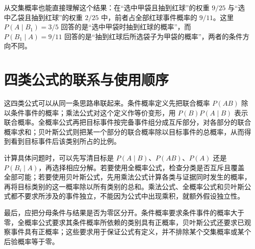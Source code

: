 \documentclass[UTF8]{ctexart}
\begin{document}
从交集概率也能直接理解这个结果：在“选中甲袋且抽到红球”的权重 $9/25$ 与“选中乙袋且抽到红球”的权重 $2/25$ 中，前者占全部红球事件概率的 $9/11$。这里 $P(A\mid B_1)=3/5$ 回答的是“选中甲袋时抽到红球的概率”，而 $P(B_1\mid A)=9/11$ 回答的是“抽到红球后所选袋子为甲袋的概率”，两者的条件方向不同。

\section{四类公式的联系与使用顺序}
\label{sec:conditional-product-connections}

这四类公式可以从同一条思路串联起来。条件概率定义先把联合概率 $P(AB)$ 除以条件事件的概率；乘法公式对这个定义作等价变形，用 $P(B)P(A\mid B)$ 表示联合概率。全概率公式再把目标事件按完备事件组分成互斥部分，对各部分的联合概率求和；贝叶斯公式则把某一个部分的联合概率除以目标事件的总概率，从而得到看到目标事件后该类别所占的比例。

计算具体问题时，可以先写清目标是 $P(A\mid B)$、$P(AB)$、$P(A)$ 还是 $P(B_i\mid A)$，再选择相应分解。若要使用全概率公式，检查分类是否互斥且覆盖全部可能；若要使用贝叶斯公式，先用乘法公式计算各类与证据同时发生的概率，再将目标类别的这一概率除以所有类别的总和。乘法公式、全概率公式和贝叶斯公式都不要求所涉及的事件独立，不能因为公式中出现乘积，就额外假设独立性。

最后，应把分母条件与结果是否为零区分开。条件概率要求条件事件的概率大于零，全概率公式要求其条件概率所依赖的类别具有正概率，贝叶斯公式还要求已观察事件具有正概率；这些要求用于保证公式有定义，并不排除某个交集概率或某个后验概率等于零。
\end{document}

